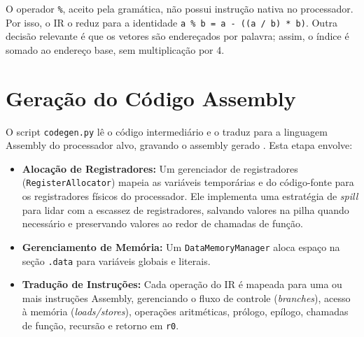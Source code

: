 \documentclass[
	12pt,				%
	oneside,
	a4paper,			%
	english,			%
	french,				%
	spanish,			%
	brazil,				%
	]{abntex2}
\begin{document}
O operador \texttt{\%}, aceito pela gramática, não possui instrução nativa no processador. Por isso, o IR o reduz para a identidade \texttt{a \% b = a - ((a / b) * b)}. Outra decisão relevante é que os vetores são endereçados por palavra; assim, o índice é somado ao endereço base, sem multiplicação por 4.

\section{Geração do Código Assembly}

O script \texttt{codegen.py} lê o código intermediário e o traduz para a linguagem Assembly do processador alvo, gravando o assembly gerado \cite{compiladoresLouden,compOrgDes}. Esta etapa envolve:
\begin{itemize}
    \item \textbf{Alocação de Registradores:} Um gerenciador de registradores (\texttt{RegisterAllocator}) mapeia as variáveis temporárias e do código-fonte para os registradores físicos do processador. Ele implementa uma estratégia de \emph{spill} para lidar com a escassez de registradores, salvando valores na pilha quando necessário e preservando valores ao redor de chamadas de função.
    \item \textbf{Gerenciamento de Memória:} Um \texttt{DataMemoryManager} aloca espaço na seção \texttt{.data} para variáveis globais e literais.
    \item \textbf{Tradução de Instruções:} Cada operação do IR é mapeada para uma ou mais instruções Assembly, gerenciando o fluxo de controle (\emph{branches}), acesso à memória (\emph{loads/stores}), operações aritméticas, prólogo, epílogo, chamadas de função, recursão e retorno em \texttt{r0}.
\end{itemize}
\end{document}
